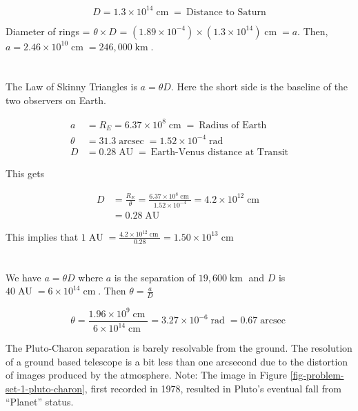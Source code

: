\documentclass[11pt]{scrartcl}
\DeclareMathOperator{\AU}{AU}
\DeclareMathOperator{\arcsec}{arcsec}
\DeclareMathOperator{\km}{km}
\DeclareMathOperator{\cm}{cm}
\DeclareMathOperator{\rad}{rad}
\newcommand\pow[2]{\ensuremath{#1 \times 10^{#2}}}
\begin{document}
\[D = \pow{1.3}{14}\cm = \ \text{Distance to Saturn}\]

Diameter of rings = $\theta \times D$ = $\left(\pow{1.89}{-4}\right) \times \left(\pow{1.3}{14}\right) \cm = a$. Then, $a = \pow{2.46}{10}\cm = 246,000\km$.


\section{}

The Law of Skinny Triangles is $a = \theta D$. Here the short side is the baseline of the two observers on Earth.

\begin{align*}
a &= R_E = \pow{6.37}{8}\cm = \ \text{Radius of Earth} \\
\theta &= 31.3 \arcsec = \pow{1.52}{-4} \rad \\
D &= 0.28\AU = \ \text{Earth-Venus distance at Transit}
\end{align*}

This gets

\begin{align*}
D &= \frac{R_E}{\theta} = \frac{\pow{6.37}{8}\cm}{\pow{1.52}{-4}} = \pow{4.2}{12}\cm \\
&= 0.28\AU
\end{align*}

This implies that $1\AU = \frac{\pow{4.2}{12}\cm}{0.28} = \pow{1.50}{13}\cm$


\section{}

We have $a = \theta D$ where $a$ is the separation of $19,600\km$ and $D$ is $40\AU = \pow{6}{14}\cm$. Then $\theta = \frac{a}{D}$

\[\theta = \frac{\pow{1.96}{9}\cm}{\pow{6}{14}\cm} = \pow{3.27}{-6}\rad = 0.67\arcsec\]

The Pluto-Charon separation is barely resolvable from the ground. The resolution of a ground based telescope is a bit less than one arcsecond due to the distortion of images produced by the atmosphere. Note: The image in Figure \ref{fig-problem-set-1-pluto-charon}, first recorded in 1978, resulted in Pluto's eventual fall from ``Planet'' status.
\end{document}
